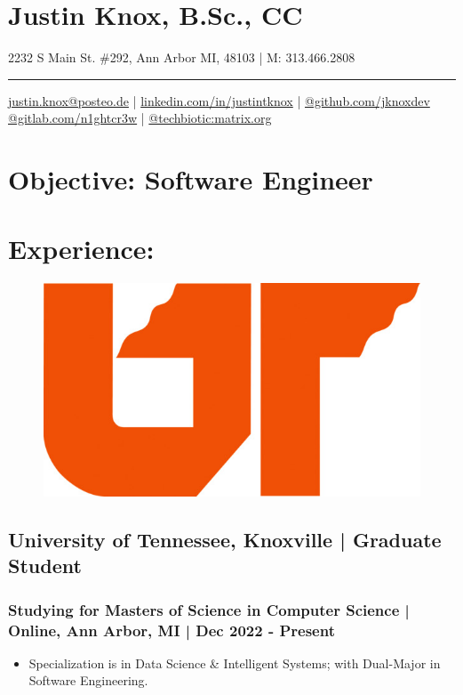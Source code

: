 \documentclass[letter,10pt]{article}
\author{arx}
\date{\today}
\title{}
\begin{document}
\section*{Justin Knox, B.Sc., CC}
\label{sec:org57b9f6e}
2232 S Main St. \#292, Ann Arbor MI, 48103 | M: 313.466.2808

\noindent\rule{\textwidth}{0.5pt}
\href{mailto:justin.knox@posteo.de}{justin.knox@posteo.de} | \href{https://www.linkedin.com/in/justintknox}{linkedin.com/in/justintknox} | \href{https://www.github.com/jknoxdev}{@github.com/jknoxdev} \\
\href{https://gitlab.com/n1ghtcr3w}{@gitlab.com/n1ghtcr3w} | \href{https://matrix.to/\#/@techbiotic:matrix.org}{@techbiotic:matrix.org}


\section*{Objective:              Software Engineer}
\label{sec:orgd61a183}
\section*{Experience:}
\label{sec:orgd8113cf}
\begin{figure}
\includegraphics[width=0.45\linewidth]{./img/50p_cr_utk.jpg}
\end{figure}

\subsection*{University of Tennessee, Knoxville | Graduate Student}
\label{sec:org15d07e7}
\subsubsection*{Studying for Masters of Science in Computer Science | Online, Ann Arbor, MI | Dec 2022 - Present}
\label{sec:org9b4b987}
\begin{itemize}
\item Specialization is in Data Science \& Intelligent Systems; with Dual-Major in Software Engineering.
\end{itemize}
\end{document}
